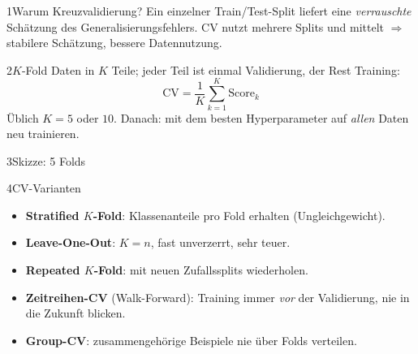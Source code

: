 
\begin{hngrid}
%
\begin{hnp}[raster multicolumn=2,acc=hnorange]{1}{Warum Kreuzvalidierung?}
Ein einzelner Train/Test-Split liefert eine \emph{verrauschte} Schätzung des Generalisierungsfehlers. CV nutzt mehrere Splits und mittelt $\Rightarrow$ stabilere Schätzung, bessere Datennutzung.
\end{hnp}
%
\begin{hnp}[raster multicolumn=2,acc=hnpurple]{2}{$K$-Fold}
Daten in $K$ Teile; jeder Teil ist einmal Validierung, der Rest Training:
\[ \mathrm{CV}=\frac1K\sum_{k=1}^{K}\mathrm{Score}_k \]
Üblich $K=5$ oder $10$. Danach: mit dem besten Hyperparameter auf \emph{allen} Daten neu trainieren.
\end{hnp}
%
\begin{hnp}[raster multicolumn=2,acc=hnteal]{3}{Skizze: 5 Folds}
\centering
{}
\end{hnp}
%
\begin{hnp}[raster multicolumn=3,acc=hnnavy]{4}{CV-Varianten}
\begin{itemize}
\item \textbf{Stratified $K$-Fold}: Klassenanteile pro Fold erhalten (Ungleichgewicht).
\item \textbf{Leave-One-Out}: $K=n$, fast unverzerrt, sehr teuer.
\item \textbf{Repeated $K$-Fold}: mit neuen Zufallssplits wiederholen.
\item \textbf{Zeitreihen-CV} (Walk-Forward): Training immer \emph{vor} der Validierung, nie in die Zukunft blicken.
\item \textbf{Group-CV}: zusammengehörige Beispiele nie über Folds verteilen.

\end{itemize}
\end{hnp}
\end{hngrid}
